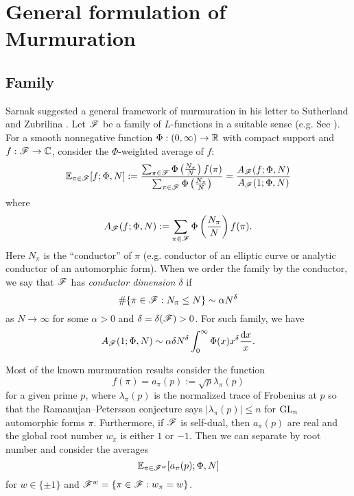 \section{General formulation of Murmuration}
\label{sec:general}


\subsection{Family}

Sarnak suggested a general framework of murmuration in his letter to Sutherland and Zubrilina \cite{sarnak}.
Let $\mathscr{F}$ be a family of $L$-functions in a suitable sense (e.g. See \cite{sarnak2016families}).
For a smooth nonnegative function $\Phi : (0, \infty) \to \mathbb{R}$ with compact support and $f : \mathscr{F} \to \mathbb{C}$, consider the $\Phi$-weighted average of $f$:
\begin{equation}
    \mathbb{E}_{\pi \in \mathscr{F}}[f; \Phi, N] := \frac{\sum_{\pi \in \mathscr{F}} \Phi\left(\frac{N_\pi}{N}\right)f(\pi)}{\sum_{\pi \in \mathscr{F}} \Phi\left(\frac{N_\pi}{N}\right)} = \frac{A_{\mathscr{F}}(f; \Phi, N)}{A_{\mathscr{F}}(1; \Phi, N)}
\end{equation}
where
\begin{equation}
    A_{\mathscr{F}}(f; \Phi, N) := \sum_{\pi \in \mathscr{F}} \Phi\left(\frac{N_\pi}{N}\right)f(\pi).
\end{equation}
Here $N_\pi$ is the ``conductor'' of $\pi$ (e.g. conductor of an elliptic curve or analytic conductor of an automorphic form).
When we order the family by the conductor, we say that $\mathscr{F}$ has \emph{conductor dimension $\delta$} if
\begin{equation}
    \# \{\pi \in \mathscr{F} : N_\pi \le N\} \sim \alpha N^\delta
\end{equation}
as $N \to \infty$ for some $\alpha > 0$ and $\delta = \delta(\mathscr{F}) > 0$.
For such family, we have
\[
A_{\mathscr{F}}(1; \Phi, N) \sim \alpha \delta N^\delta \int_0^\infty \Phi(x) x^\delta \frac{\mathrm{d} x}{x}.
\]

Most of the known murmuration results consider the function
\begin{equation}
    f(\pi) = a_\pi(p) := \sqrt{p} \lambda_\pi(p)
\end{equation}
for a given prime $p$, where $\lambda_\pi(p)$ is the normalized trace of Frobenius at $p$ so that the Ramanujan--Petersson conjecture says $|\lambda_\pi(p)| \le n$ for $\mathrm{GL}_n$ automorphic forms $\pi$.
Furthermore, if $\mathscr{F}$ is self-dual, then $a_\pi(p)$ are real and the global root number $w_\pi$ is either $1$ or $-1$.
Then we can separate by root number and consider the averages
\begin{equation}
    \mathbb{E}_{\pi \in \mathscr{F}^w} [a_\pi(p); \Phi, N]
\end{equation}
for $w \in \{\pm 1\}$ and $\mathscr{F}^w = \{\pi \in \mathscr{F} : w_\pi = w\}$.

